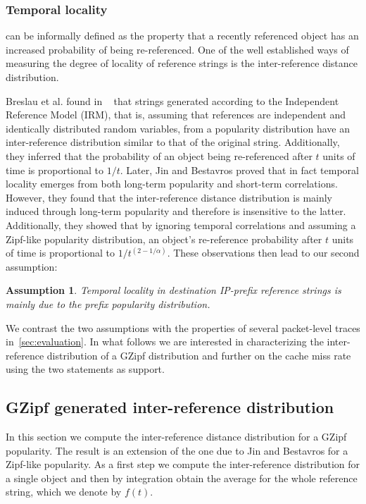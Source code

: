 \documentclass[twocolumn, 10pt]{article}
\theoremstyle{plain}
\newtheorem{assumption}{Assumption}
\begin{document}
\subsubsection{Temporal locality} can be informally defined as the property that a recently
referenced object has an increased probability of being re-referenced. 
One of the well established ways of measuring the degree of locality of
reference strings is the inter-reference distance distribution. 



Breslau et al. found in ~\cite{breslau:web_and_zipf} that strings generated
according to the Independent Reference Model (IRM), that is, assuming that
references are independent and identically distributed random variables, from
a popularity distribution have an inter-reference distribution similar to that
of the original string. Additionally, they inferred that the probability of an
object being re-referenced after $t$ units of time is proportional to $1/t$.
Later, Jin and Bestavros proved that in fact temporal locality emerges from
both long-term popularity and short-term correlations. However, they found
that the inter-reference distance distribution is mainly induced through
long-term popularity and therefore is insensitive to the latter. Additionally,
they showed that by ignoring temporal correlations and assuming a Zipf-like
popularity distribution, an object's re-reference probability after $t$ units
of time is proportional to  $1/t^{(2-1/\alpha)}$. These observations then lead
to our second assumption:

\begin{assumption}\label{prop:tloc}
    Temporal locality in destination IP-prefix reference strings is mainly due
    to the prefix popularity distribution.
\end{assumption}

We contrast the two assumptions with the properties of several packet-level
traces in~\ref{sec:evaluation}. In what follows we are interested in
characterizing the inter-reference distribution of a GZipf distribution and
further on the cache miss rate using the two statements as support.

\subsection{GZipf generated inter-reference distribution}

In this section we compute the inter-reference distance distribution for a GZipf
popularity. The result is an extension of the one due to Jin and Bestavros for
a Zipf-like popularity. As a first step we compute the inter-reference
distribution for a single object and then by integration obtain the average
for the whole reference string, which we denote by $f(t)$.
\end{document}
